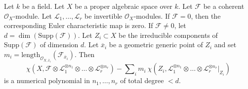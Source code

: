 \begin{lemma}
\label{lemma-numerical-polynomial-leading-term}
Let $k$ be a field. Let $X$ be a proper algebraic space over $k$. Let
$\mathcal{F}$ be a coherent $\mathcal{O}_X$-module. Let
$\mathcal{L}_1, \ldots, \mathcal{L}_r$ be invertible $\mathcal{O}_X$-modules.
If $\mathcal{F} = 0$, then the corresponding Euler characteristic map is
zero. If $\mathcal{F} \not = 0$, let
$d = \dim(\text{Supp}(\mathcal{F}))$.
Let $Z_i \subset X$ be the irreducible components
of $\text{Supp}(\mathcal{F})$ of dimension $d$. Let $\overline{x}_i$
be a geometric generic point of $Z_i$ and set
$m_i = \text{length}_{\mathcal{O}_{X, \overline{x}_i}}
(\mathcal{F}_{\overline{x}_i})$.
Then
$$
\chi(X, \mathcal{F} \otimes \mathcal{L}_1^{\otimes n_1} \otimes \ldots \otimes
\mathcal{L}_r^{\otimes n_r}) -
\sum\nolimits_i
m_i\ \chi(Z_i, \mathcal{L}_1^{\otimes n_1} \otimes \ldots \otimes
\mathcal{L}_r^{\otimes n_r}|_{Z_i})
$$
is a numerical polynomial in $n_1, \ldots, n_r$ of total degree $< d$.
\end{lemma}

